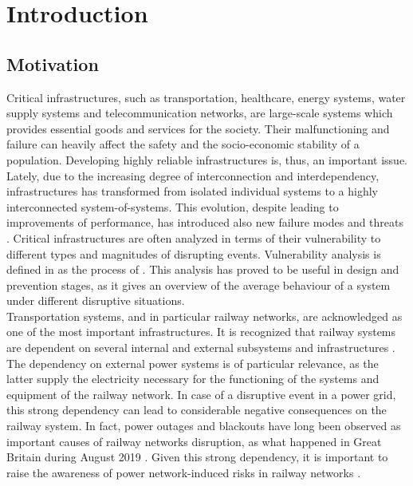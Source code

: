 \documentclass[review]{elsarticle}
\begin{document}
	\section{Introduction}
	\subsection{Motivation}
	Critical infrastructures, such as transportation, healthcare, energy systems, water supply systems and telecommunication networks, are large-scale systems which provides essential goods and services for the society. Their malfunctioning and failure can heavily affect the safety and the socio-economic stability of a population. Developing highly reliable infrastructures is, thus, an important issue. Lately, due to the increasing degree of interconnection and interdependency, infrastructures has transformed from isolated individual systems to a highly interconnected system-of-systems. This evolution, despite leading to improvements of performance, has introduced also new failure modes and threats \cite{buldyrev2010catastrophic}. Critical infrastructures are often analyzed in terms of their vulnerability to different types and magnitudes of disrupting events. Vulnerability analysis is defined in \cite{johansson2011vulnerability} as the process of . This analysis has proved to be useful in design and prevention stages, as it gives an overview of the average behaviour of a system under different disruptive situations.\\
	Transportation systems, and in particular railway networks, are acknowledged as one of the most important infrastructures. It is recognized that railway systems are dependent on several internal and external subsystems and infrastructures \cite{pant2016vulnerability}. The dependency on external power systems is of particular relevance, as the latter supply the electricity necessary for the functioning of the systems and equipment of the railway network. In case of a disruptive event in a power grid, this strong dependency can lead to considerable negative consequences on the railway system. In fact, power outages and blackouts have long been observed as important causes of railway networks disruption, as what happened in Great Britain during August 2019 \cite{GBblackout_1}\cite{GBblackout_2}. Given this strong dependency, it is important to raise the awareness of power network-induced risks in railway networks \cite{uicenews616}.\\
\end{document}
